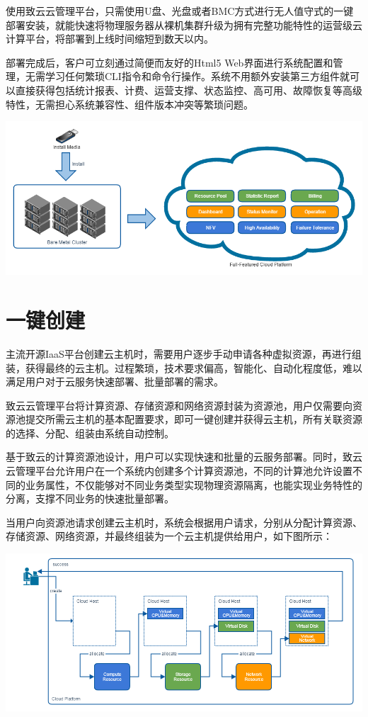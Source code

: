 \documentclass[letterpaper,10pt]{sphinxmanual}
\begin{document}
使用致云云管理平台，只需使用U盘、光盘或者BMC方式进行无人值守式的一键部署安装，就能快速将物理服务器从裸机集群升级为拥有完整功能特性的运营级云计算平台，将部署到上线时间缩短到数天以内。

部署完成后，客户可立刻通过简便而友好的Html5 Web界面进行系统配置和管理，无需学习任何繁琐CLI指令和命令行操作。系统不用额外安装第三方组件就可以直接获得包括统计报表、计费、运营支撑、状态监控、高可用、故障恢复等高级特性，无需担心系统兼容性、组件版本冲突等繁琐问题。

\includegraphics{1_1_one_click_install.png}


\section{一键创建}
\label{index:id5}
主流开源IaaS平台创建云主机时，需要用户逐步手动申请各种虚拟资源，再进行组装，获得最终的云主机。过程繁琐，技术要求偏高，智能化、自动化程度低，难以满足用户对于云服务快速部署、批量部署的需求。

致云云管理平台将计算资源、存储资源和网络资源封装为资源池，用户仅需要向资源池提交所需云主机的基本配置要求，即可一键创建并获得云主机，所有关联资源的选择、分配、组装由系统自动控制。

基于致云的计算资源池设计，用户可以实现快速和批量的云服务部署。同时，致云云管理平台允许用户在一个系统内创建多个计算资源池，不同的计算池允许设置不同的业务属性，不仅能够对不同业务类型实现物理资源隔离，也能实现业务特性的分离，支撑不同业务的快速批量部署。

当用户向资源池请求创建云主机时，系统会根据用户请求，分别从分配计算资源、存储资源、网络资源，并最终组装为一个云主机提供给用户，如下图所示：

\includegraphics{1_2_1_one_click_create.png}
\end{document}
